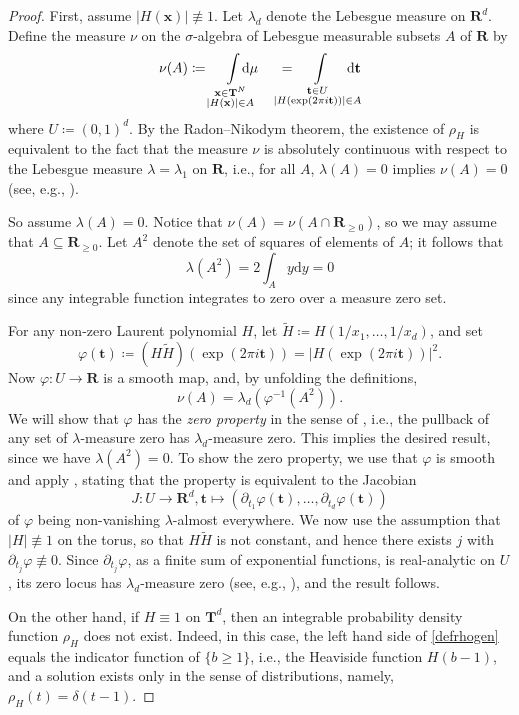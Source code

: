 \documentclass[12pt,reqno]{amsart}
\theoremstyle{definition}
\theoremstyle{plain}
\theoremstyle{definition}
\newcommand{\R}{\mathbf{R}}
\newcommand{\T}{\mathbf{T}}
\renewcommand{\geq}{\geqslant}
\renewcommand{\d}{\mathrm{d}}
\begin{document}
\begin{proof} First, assume 
$|H(\mathbf x)| \not\equiv 1$.
Let $\lambda_d$ denote the Lebesgue measure on $\R^d$. Define the measure $\nu$ on the $\sigma$-algebra of Lebesgue measurable subsets $A$ of $\R$ by 
$$ \nu(A) \coloneqq \int\limits_{\substack{ \mathbf x \in \T^N \\|H(\mathbf x)| \in A}} \hspace*{-5mm} \, \d \mu \hspace*{5mm} = \hspace*{-5mm} \int\limits_{\substack{ \mathbf t \in U \\|H(\exp(2 \pi i \mathbf t))| \in A}} \hspace*{-5mm}  \d \mathbf t $$
where $U \coloneqq (0,1)^d$. By the Radon--Nikodym theorem, the existence of $\rho_H$ is equivalent to the fact that the measure $\nu$ is absolutely continuous with respect to the Lebesgue measure $\lambda=\lambda_1$ on $\R$, i.e., for all $A$, $\lambda(A)=0$ implies $\nu(A)=0$ (see, e.g., \cite[Thm.\ 31.8]{Bil}). 

So assume $\lambda(A)=0$. Notice that $\nu(A) = \nu(A \cap \R_{\geq 0})$, so we may assume that $A \subseteq \R_{\geq 0}$. Let $A^2$ denote the set of squares of elements of $A$; it follows that $$\lambda(A^2) = 2 \int_{A} y \d y =0$$
since any integrable function integrates to zero over a measure zero set. 

For any non-zero Laurent polynomial $H$, let $\tilde H \coloneqq H(1/x_1,\dots,1/x_d)$, and set 
$$ \varphi(\mathbf t) \coloneqq (H \tilde H)(\exp(2 \pi i \mathbf t)) = |H(\exp(2 \pi i \mathbf t))|^2. $$ Now $\varphi \colon U \rightarrow \R$ is a smooth map, and, by unfolding the definitions,  
$$ \nu(A) = \lambda_d(\varphi^{-1}(A^2)). $$
We will show that $\varphi$ has the \emph{zero property} in the sense of \cite{Pon}, i.e., the pullback of any set of $\lambda$-measure zero has $\lambda_d$-measure zero. This implies the desired result, since we have $\lambda(A^2)=0$. To show the zero property, we use that $\varphi$ is smooth and apply \cite[Theorem 1]{Pon}, stating that the property is equivalent to the Jacobian $$J \colon U \rightarrow \R^d, \mathbf t \mapsto (\partial_{t_1} \varphi(\mathbf t),\dots,\partial_{t_d} \varphi(\mathbf t))$$ of $\varphi$ being non-vanishing $\lambda$-almost everywhere. We now use the assumption that $|H| \not \equiv 1$ on the torus, so that $H \tilde H$ is not constant, and hence there exists $j$ with $\partial_{t_j} \varphi \not \equiv 0$. Since $\partial_{t_j} \varphi$, as a finite sum of exponential functions, is real-analytic on $U$, its zero locus has $\lambda_d$-measure zero (see, e.g., \cite{Mit}), and the result follows. 

On the other hand, if $H \equiv 1$ on $\T^d$, then an integrable probability density function $\rho_H$ does not exist. Indeed, in this case, the left hand side of \eqref{defrhogen} equals the indicator function of $\{ b \geq 1\}$, i.e., the Heaviside function $H(b-1)$, and a solution exists only in the sense of distributions, namely, $\rho_H(t) = \delta(t-1)$. 
\end{proof} 
\end{document}
